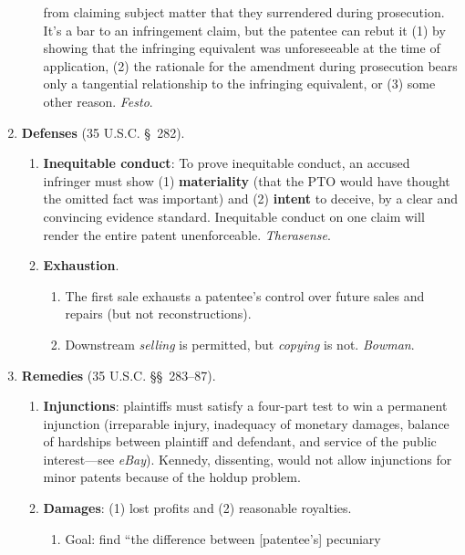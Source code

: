 \begin{enumerate}
\begin{enumerate}
        from claiming subject matter that they surrendered during prosecution.  
        It's a bar to an infringement claim, but the patentee can rebut it (1) 
        by showing that the infringing equivalent was unforeseeable at the 
        time of application, (2) the rationale for the amendment during 
        prosecution bears only a tangential relationship to the infringing 
        equivalent, or (3) some other reason. \emph{Festo}.
    \end{enumerate}
    \item \textbf{Defenses} (35 U.S.C. \S\ 282).
    \begin{enumerate}
        \item \textbf{Inequitable conduct}: To prove inequitable conduct, an 
        accused infringer must show (1) \textbf{materiality} (that the PTO 
        would have thought the omitted fact was important) and (2) 
        \textbf{intent} to deceive, by a clear and convincing evidence 
        standard. Inequitable conduct on one claim will render the entire 
        patent unenforceable. \emph{Therasense}.
        \item \textbf{Exhaustion}.
        \begin{enumerate}
            \item The first sale exhausts a patentee's control over future 
            sales and repairs (but not reconstructions).
            \item Downstream \emph{selling} is permitted, but \emph{copying} 
            is not. \emph{Bowman}.
        \end{enumerate}
    \end{enumerate}
    \item \textbf{Remedies} (35 U.S.C. \S\S\ 283--87).
    \begin{enumerate}
        \item \textbf{Injunctions}: plaintiffs must satisfy a four-part test 
        to win a permanent injunction (irreparable injury, inadequacy of 
        monetary damages, balance of hardships between plaintiff and 
        defendant, and service of the public interest---see \emph{eBay}).  
        Kennedy, dissenting, would not allow injunctions for minor patents 
        because of the holdup problem.
        \item \textbf{Damages}: (1) lost profits and (2) reasonable royalties.
        \begin{enumerate}
            \item Goal: find ``the difference between [patentee's] pecuniary 

\end{enumerate}
\end{enumerate}
\end{enumerate}
